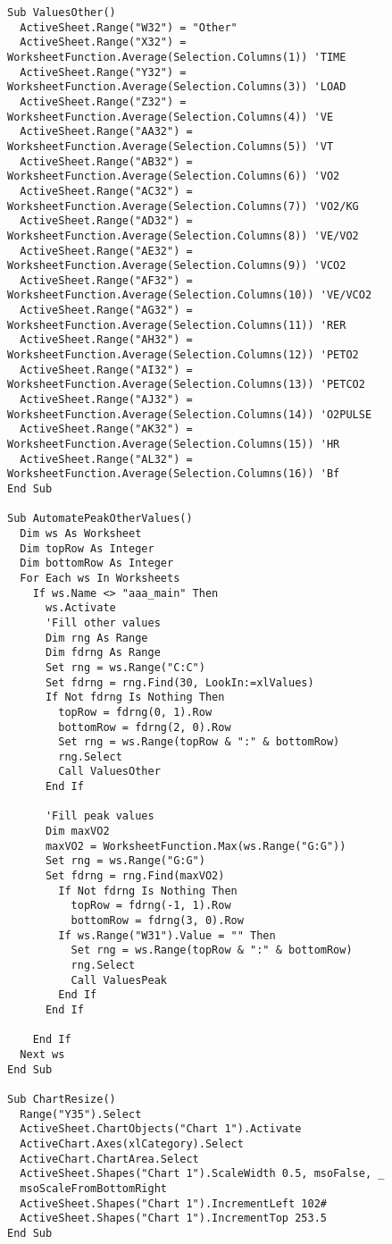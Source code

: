 \begin{lstlisting}
Sub ValuesOther()
  ActiveSheet.Range("W32") = "Other"
  ActiveSheet.Range("X32") = WorksheetFunction.Average(Selection.Columns(1)) 'TIME
  ActiveSheet.Range("Y32") = WorksheetFunction.Average(Selection.Columns(3)) 'LOAD
  ActiveSheet.Range("Z32") = WorksheetFunction.Average(Selection.Columns(4)) 'VE
  ActiveSheet.Range("AA32") = WorksheetFunction.Average(Selection.Columns(5)) 'VT
  ActiveSheet.Range("AB32") = WorksheetFunction.Average(Selection.Columns(6)) 'VO2
  ActiveSheet.Range("AC32") = WorksheetFunction.Average(Selection.Columns(7)) 'VO2/KG
  ActiveSheet.Range("AD32") = WorksheetFunction.Average(Selection.Columns(8)) 'VE/VO2
  ActiveSheet.Range("AE32") = WorksheetFunction.Average(Selection.Columns(9)) 'VCO2
  ActiveSheet.Range("AF32") = WorksheetFunction.Average(Selection.Columns(10)) 'VE/VCO2
  ActiveSheet.Range("AG32") = WorksheetFunction.Average(Selection.Columns(11)) 'RER
  ActiveSheet.Range("AH32") = WorksheetFunction.Average(Selection.Columns(12)) 'PETO2
  ActiveSheet.Range("AI32") = WorksheetFunction.Average(Selection.Columns(13)) 'PETCO2
  ActiveSheet.Range("AJ32") = WorksheetFunction.Average(Selection.Columns(14)) 'O2PULSE
  ActiveSheet.Range("AK32") = WorksheetFunction.Average(Selection.Columns(15)) 'HR
  ActiveSheet.Range("AL32") = WorksheetFunction.Average(Selection.Columns(16)) 'Bf
End Sub

Sub AutomatePeakOtherValues()
  Dim ws As Worksheet
  Dim topRow As Integer
  Dim bottomRow As Integer
  For Each ws In Worksheets
    If ws.Name <> "aaa_main" Then
      ws.Activate
      'Fill other values
      Dim rng As Range
      Dim fdrng As Range
      Set rng = ws.Range("C:C")
      Set fdrng = rng.Find(30, LookIn:=xlValues)
      If Not fdrng Is Nothing Then
        topRow = fdrng(0, 1).Row
        bottomRow = fdrng(2, 0).Row
        Set rng = ws.Range(topRow & ":" & bottomRow)
        rng.Select
        Call ValuesOther
      End If
    
      'Fill peak values
      Dim maxVO2
      maxVO2 = WorksheetFunction.Max(ws.Range("G:G"))
      Set rng = ws.Range("G:G")
      Set fdrng = rng.Find(maxVO2)
        If Not fdrng Is Nothing Then
          topRow = fdrng(-1, 1).Row
          bottomRow = fdrng(3, 0).Row
        If ws.Range("W31").Value = "" Then
          Set rng = ws.Range(topRow & ":" & bottomRow)
          rng.Select
          Call ValuesPeak
        End If
      End If
      
    End If
  Next ws
End Sub

Sub ChartResize()
  Range("Y35").Select
  ActiveSheet.ChartObjects("Chart 1").Activate
  ActiveChart.Axes(xlCategory).Select
  ActiveChart.ChartArea.Select
  ActiveSheet.Shapes("Chart 1").ScaleWidth 0.5, msoFalse, _
  msoScaleFromBottomRight
  ActiveSheet.Shapes("Chart 1").IncrementLeft 102#
  ActiveSheet.Shapes("Chart 1").IncrementTop 253.5
End Sub


\end{lstlisting}
